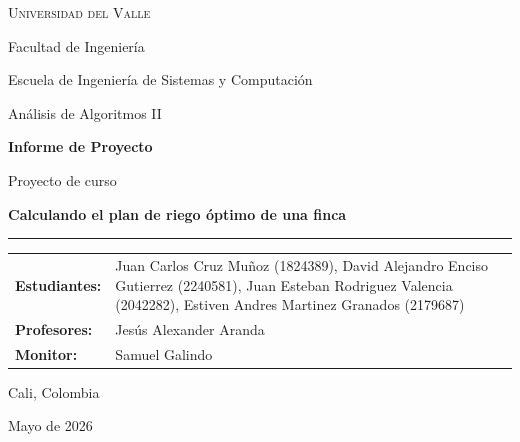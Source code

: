 \documentclass[12pt,a4paper]{article}
\begin{document}
\hypersetup{pageanchor=false}
\begin{titlepage}
  \thispagestyle{empty}
  \begingroup
  \setlength{\parskip}{0pt}
  \centering
  \vspace*{0.5cm}

  {\large\scshape Universidad del Valle\par}
  \vspace{0.12cm}
  {\normalsize Facultad de Ingenier\'ia\par}
  \vspace{0.12cm}
  {\normalsize Escuela de Ingenier\'ia de Sistemas y Computaci\'on\par}
  \vspace{0.12cm}
  {\normalsize An\'alisis de Algoritmos II\par}

  \vspace{1.4cm}

  {\Large\bfseries Informe de Proyecto\par}
  \vspace{0.35cm}
  {\normalsize Proyecto de curso\par}
  \vspace{0.45cm}
  {\LARGE\bfseries Calculando el plan de riego \'optimo de una finca\par}
  \vspace{0.5cm}
  \rule{0.78\textwidth}{0.9pt}\par

  \vspace{1.2cm}

  \begin{minipage}{0.82\textwidth}
    \centering
    \renewcommand{\arraystretch}{1.25}
    \begin{tabular}{>{\bfseries}p{4cm}p{8.2cm}}
      Estudiantes: & Juan Carlos Cruz Mu\~noz (1824389), David Alejandro Enciso Gutierrez (2240581), Juan Esteban Rodriguez Valencia (2042282), Estiven Andres Martinez Granados (2179687) \\
      Profesores: & Jes\'us Alexander Aranda \\
      Monitor: & Samuel Galindo \\
    \end{tabular}
  \end{minipage}

  \vfill

  {\normalsize Cali, Colombia\par}
  \vspace{0.15cm}
  {\normalsize Mayo de 2026\par}
  \endgroup
\end{titlepage}
\end{document}
